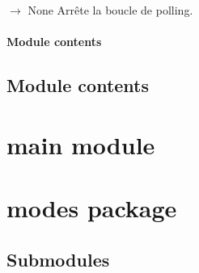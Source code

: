 \documentclass[letterpaper,10pt,french]{sphinxmanual}
\begin{document}
\begin{fulllineitems}
\begin{fulllineitems}
\end{fulllineitems}


\begin{fulllineitems}
\label{\detokenize{api/hardware.transports:hardware.transports.wifi_client.WifiClient.stop}}
\pysigstartsignatures
\pysiglinewithargsret
{}
{}
{{ $\rightarrow$ None}}
\pysigstopsignatures
\sphinxAtStartPar
Arrête la boucle de polling.

\end{fulllineitems}


\end{fulllineitems}



\paragraph{Module contents}
\label{\detokenize{api/hardware.transports:module-hardware.transports}}\label{\detokenize{api/hardware.transports:module-contents}}

\subsection{Module contents}
\label{\detokenize{api/hardware:module-hardware}}\label{\detokenize{api/hardware:module-contents}}
\sphinxstepscope


\section{main module}
\label{\detokenize{api/main:main-module}}\label{\detokenize{api/main::doc}}
\sphinxstepscope


\section{modes package}
\label{\detokenize{api/modes:modes-package}}\label{\detokenize{api/modes::doc}}

\subsection{Submodules}
\label{\detokenize{api/modes:submodules}}
\end{document}
